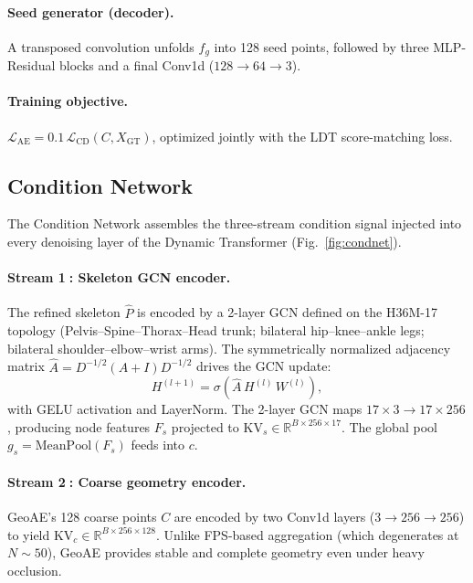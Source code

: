 \documentclass{article}
\newcommand{\Rbb}{\mathbb{R}}
\begin{document}
\paragraph{Seed generator (decoder).}
A transposed convolution unfolds $f_g$ into 128 seed points,
followed by three MLP-Residual blocks and a final Conv1d
($128\!\to\!64\!\to\!3$).

\paragraph{Training objective.}
$\mathcal{L}_\text{AE} = 0.1\,\mathcal{L}_\text{CD}(C, X_\text{GT})$,
optimized jointly with the LDT score-matching loss.

\subsection{Condition Network}
\label{sec:condnet}

The Condition Network assembles the three-stream condition signal injected into
every denoising layer of the Dynamic Transformer (Fig.~\ref{fig:condnet}).

\paragraph{Stream \textcircled{1}: Skeleton GCN encoder.}
The refined skeleton $\hat{P}$ is encoded by a 2-layer GCN defined on the
H36M-17 topology (Pelvis--Spine--Thorax--Head trunk;
bilateral hip--knee--ankle legs; bilateral shoulder--elbow--wrist arms).
The symmetrically normalized adjacency matrix
$\hat{A} = D^{-1/2}(A+I)D^{-1/2}$ drives the GCN update:
\begin{equation}
  H^{(l+1)} = \sigma\!\left(\hat{A}\,H^{(l)}\,W^{(l)}\right),
\end{equation}
with GELU activation and LayerNorm.
The 2-layer GCN maps $17\!\times\!3\!\to\!17\!\times\!256$, producing node
features $F_s$ projected to $\mathrm{KV}_s\!\in\!\Rbb^{B\times256\times17}$.
The global pool $g_s\!=\!\mathrm{MeanPool}(F_s)$ feeds into $c$.

\paragraph{Stream \textcircled{2}: Coarse geometry encoder.}
GeoAE's 128 coarse points $C$ are encoded by two Conv1d layers
($3\!\to\!256\!\to\!256$) to yield
$\mathrm{KV}_c\!\in\!\Rbb^{B\times256\times128}$.
Unlike FPS-based aggregation (which degenerates at $N\!\sim\!50$),
GeoAE provides stable and complete geometry even under heavy occlusion.
\end{document}
